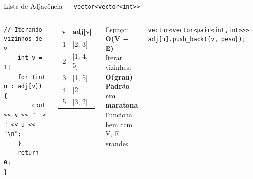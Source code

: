 \documentclass[aspectratio=169,10pt]{beamer}
\begin{document}
\begin{frame}[fragile]{Lista de Adjacência --- \texttt{vector<vector<int>>}}
\begin{columns}[t]
\begin{tcolorbox}[caixaCodigo]
\begin{lstlisting}[style=cppstyle]
    // Iterando vizinhos de v
    int v = 1;
    for (int u : adj[v]) {
        cout << v << " -> " << u << "\n";
    }
    return 0;
}
        \end{lstlisting}
      \end{tcolorbox}
      \begin{tcolorbox}[caixaGrafo,title={Visualização}]
        \centering\footnotesize
        \quad
        \begin{tabular}{r|l}
          \textbf{v} & \textbf{adj[v]}\\
          \hline
          1 & [2, 3]\\
          2 & [1, 4, 5]\\
          3 & [1, 5]\\
          4 & [2]\\
          5 & [3, 2]\\
        \end{tabular}
      \end{tcolorbox}
      \vspace{0.07cm}
      \begin{tcolorbox}[caixaVerde,title={Vantagens}]
        \footnotesize
        Espaço: \textbf{O(V + E)}\\
        Iterar vizinhos: \textbf{O(grau)}\\
        \textbf{Padrão em maratona}\\
        Funciona bem com V, E grandes
      \end{tcolorbox}
      \vspace{0.07cm}
      \begin{tcolorbox}[caixaLaranja,title={Grafo ponderado}]
        \footnotesize
        \texttt{vector<vector<pair<int,int>>>}\\
        \texttt{adj[u].push\_back(\{v, peso\});}
      \end{tcolorbox}
  \end{columns}
\end{frame}
\end{document}
